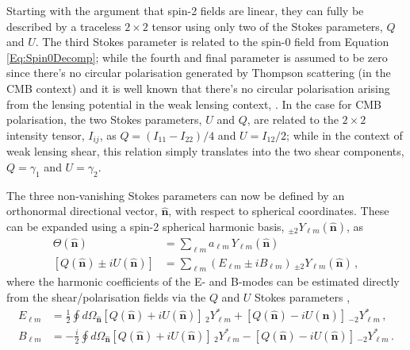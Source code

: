 \qquad Starting with the argument that spin-2 fields are linear, they can fully be described by a traceless $2 \times 2$ tensor using only two of the Stokes parameters, $Q$ and $U$. The third Stokes parameter is related to the spin-0 field from Equation \eqref{Eq:Spin0Decomp}; while the fourth and final parameter is assumed to be zero since there's no circular polarisation generated by Thompson scattering (in the CMB context) and it is well known that there's no circular polarisation arising from the lensing potential in the weak lensing context, \citep{2005astro.ph..9252S,2017SchpJ..1232440B}. In the case for CMB polarisation, the two Stokes parameters, $U$ and $Q$, are related to the $2\times 2$ intensity tensor, $I_{ij}$, as $Q=(I_{11}-I_{22})/4$ and $U=I_{12}/2$; while in the context of weak lensing shear, this relation simply translates into the two shear components, $Q=\gamma_1$ and $U=\gamma_2$.

\qquad The three non-vanishing Stokes parameters can now be defined by an orthonormal directional vector, $\hat{\mathbf{n}}$, with respect to spherical coordinates. These can be expanded using a spin-2 spherical harmonic basis, $_{\pm 2}Y_{\ell m}(\hat{\mathbf{n}})$, as 
\begin{align}
\label{eqn::chCmbPol_stokes_paras}
\Theta(\hat{\mathbf{n}}) &= \sum_{\ell m}a_{\ell m}\,Y_{\ell m}(\hat{\mathbf{n}}) \\
\left[ Q(\hat{\mathbf{n}})\pm iU(\hat{\mathbf{n}}) \right] &= \sum_{\ell m}\left(E_{\ell m}\pm iB_{\ell m} \right)\,_{\pm 2}Y_{\ell m}(\hat{\mathbf{n}})\, ,
\end{align}
\noindent where the harmonic coefficients of the E- and B-modes can be estimated directly from the shear/polarisation fields via the $Q$ and $U$ Stokes parameters \citep{PolSpice2005,Hikage2011},
\begin{align}
E_{\ell m} & = \frac{1}{2}\oint d\Omega_{\hat{\mathbf{n}}} \left[ Q(\hat{\mathbf{n}}) + iU(\hat{\mathbf{n}}) \right]\,_2Y^*_{\ell m} + \left[ Q(\hat{\mathbf{n}}) - iU(\hat{\mathbf{n}}) \right]\,_{-2}Y^*_{\ell m} \, ,\\
B_{\ell m} & = -\frac{i}{2}\oint d\Omega_{\hat{\mathbf{n}}} \left[ Q(\hat{\mathbf{n}}) + iU(\hat{\mathbf{n}}) \right]\,_2Y^*_{\ell m} - \left[ Q(\hat{\mathbf{n}}) - iU(\hat{\mathbf{n}}) \right]\,_{-2}Y^*_{\ell m}\, .
\end{align}

